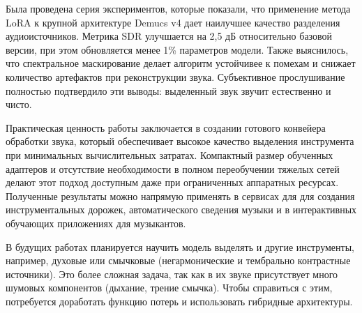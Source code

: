 \documentclass[14pt]{extarticle}
\begin{document}
Была проведена серия экспериментов, которые показали, что применение метода LoRA к крупной архитектуре Demucs v4 дает 
наилучшее качество разделения аудиоисточников. 
Метрика SDR улучшается на 2,5 дБ относительно базовой версии, при этом обновляется менее 1\% параметров модели. 
Также выяснилось, что спектральное маскирование делает алгоритм устойчивее к помехам и снижает количество артефактов при 
реконструкции звука. Субъективное прослушивание полностью подтвердило эти выводы: выделенный звук звучит естественно и чисто.

Практическая ценность работы заключается в создании готового конвейера обработки звука, который обеспечивает 
высокое качество выделения инструмента при минимальных вычислительных затратах. 
Компактный размер обученных адаптеров и отсутствие необходимости в полном переобучении тяжелых сетей делают этот 
подход доступным даже при ограниченных аппаратных ресурсах. 
Полученные результаты можно напрямую применять в сервисах для для создания инструментальных дорожек, 
автоматического сведения музыки и в интерактивных обучающих приложениях для музыкантов.

В будущих работах планируется научить модель выделять и другие инструменты, например, духовые или смычковые (негармонические и тембрально контрастные источники).
Это более сложная задача, так как в их звуке присутствует много шумовых компонентов (дыхание, трение смычка). 
Чтобы справиться с этим, потребуется доработать функцию потерь и использовать гибридные архитектуры.
\end{document}
